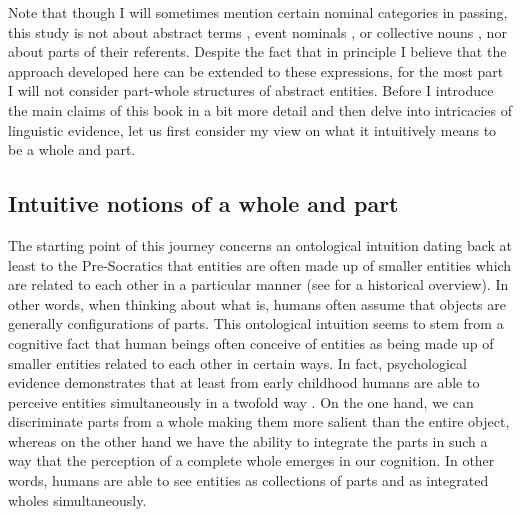 Note that though I will sometimes mention certain nominal categories in passing, this study is not about abstract terms \citep[see, e.g.,][]{asher1993reference,tovena2001between,nicolas2002mass,moltmann2013abstract}, event nominals \citep[see, e.g.,][]{grimshaw1990argument,grimshaw2011deverbal,bierwisch1990event,borer2005normal}, or collective nouns \citep[see, e.g.,][]{landman1989groupsi,landman1989groupsii,barker1992group,schwarzschild1996pluralities,pearson2011new,de_vries2015shifting}, nor about parts of their referents. Despite the fact that in principle I believe that the approach developed here can be extended to these expressions, for the most part I will not consider part-whole structures of abstract entities. Before I introduce the main claims of this book in a bit more detail and then delve into intricacies of linguistic evidence, let us first consider my view on what it intuitively means to be a whole and part.

\subsection{Intuitive notions of a whole and part}\label{sec:intuitive-notions-of-a-whole-and-part}

	The starting point of this journey concerns an ontological intuition dating back at least to the Pre-Socratics that entities are often made up of smaller entities which are related to each other in a particular manner (see \citealt{varzi2016mereology} for a historical overview). In other words, when thinking about what is, humans often assume that objects are generally configurations of parts. This ontological intuition seems to stem from a cognitive fact that human beings often conceive of entities as being made up of smaller entities related to each other in certain ways. In fact, psychological evidence demonstrates that at least from early childhood humans are able to perceive entities simultaneously in a twofold way \citep[e.g.,][]{elkind_koegler_go1964studies,kimchi1993basic,boisvert_standing_moller1999successful}. On the one hand, we can discriminate parts from a whole making them more salient than the entire object, whereas on the other hand we have the ability to integrate the parts in such a way that the perception of a complete whole emerges in our cognition. In other words, humans are able to see entities as collections of parts and as integrated wholes simultaneously. 
    
